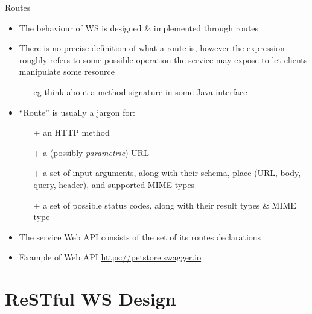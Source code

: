 \documentclass[presentation]{beamer}\mode<presentation>{\usetheme{AMSBolognaFC}}
\begin{document}
\begin{frame}{Routes}

    \begin{itemize}
        \item The behaviour of WS is designed \& implemented through \alert{routes}

        \vfill

        \item There is no precise definition of what a route is, however the expression roughly refers to some \alert{possible operation} the service may expose to let clients manipulate some \alert{resource}
        \begin{itemize}
            \item[eg] think about a method signature in some Java interface
        \end{itemize}

        \vfill

        \item ``Route'' is usually a \alert{jargon} for:
        \begin{itemize}
            \item[+] an HTTP \alert{method}

            \item[+] a (possibly \emph{parametric}) URL

            \item[+] a set of input arguments, along with their schema, place (URL, body, query, header), and supported MIME types

            \item[+] a set of possible status codes, along with their result types \& MIME type
        \end{itemize}

        \vfill

        \item The service \alert{Web API} consists of the set of its routes declarations

        \vfill

        \item Example of \alert{Web API} \url{https://petstore.swagger.io}
    \end{itemize}

\end{frame}

\section{ReSTful WS Design}
\end{document}
